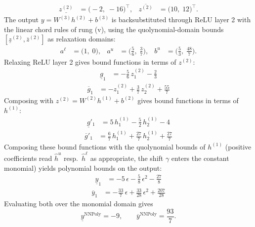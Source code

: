 \documentclass[11pt]{article}
\begin{document}
\begin{align*}
\underline{z^{(2)}} &= \bigl(-2,\; -16\bigr)^{\!\top}, & \overline{z^{(2)}} &= \bigl(10,\; 12\bigr)^{\!\top}.
\end{align*}
The output $y = W^{(3)} h^{(2)} + b^{(3)}$ is backsubstituted through ReLU layer 2 with the linear chord rules of rung (v), using the quolynomial-domain bounds
$[\underline{z}^{(2)}, \overline{z}^{(2)}]$ as relaxation domains:
\begin{align*}
a^{\ell} &= \bigl(1,\; 0\bigr), & a^{u} &= \bigl(\frac{5}{6},\; \frac{3}{7}\bigr), & b^{u} &= \bigl(\frac{5}{3},\; \frac{48}{7}\bigr).
\end{align*}
Relaxing ReLU layer 2 gives bound functions in terms of $z^{(2)}$:
\begin{align*}
\underline{g}_{1} &= -\frac{5}{6}\,z^{(2)}_{1} - \frac{2}{3}
\end{align*}
\begin{align*}
\overline{g}_{1} &= -z^{(2)}_{1} + \frac{3}{7}\,z^{(2)}_{2} + \frac{55}{7}
\end{align*}
Composing with $z^{(2)} = W^{(2)} h^{(1)} + b^{(2)}$ gives bound functions in terms of $h^{(1)}$:
\begin{align*}
\underline{g}'_{1} &= 5\,h^{(1)}_{1} - \frac{5}{2}\,h^{(1)}_{2} - 4
\end{align*}
\begin{align*}
\overline{g}'_{1} &= \frac{6}{7}\,h^{(1)}_{1} + \frac{27}{7}\,h^{(1)}_{2} + \frac{27}{7}
\end{align*}
Composing these bound functions with the quolynomial bounds of $h^{(1)}$ (positive
coefficients read $\hat{h}^{u}$ resp.\ $\hat{h}^{\ell}$ as appropriate, the shift $\gamma$ enters the
constant monomial) yields polynomial bounds on the output:
\begin{align*}
\underline{y}_{1} &= -5\,\epsilon - \frac{5}{8}\,\epsilon^2 - \frac{27}{8}
\end{align*}
\begin{align*}
\overline{y}_{1} &= -\frac{33}{7}\,\epsilon + \frac{33}{28}\,\epsilon^2 + \frac{207}{28}
\end{align*}
Evaluating both over the monomial domain gives
\begin{equation*}
\underline{y}^{\text{NNPoly}} = -9, \qquad \overline{y}^{\text{NNPoly}} = \frac{93}{7}.
\end{equation*}
\end{document}
